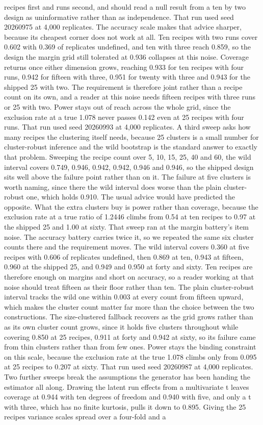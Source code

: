 recipes first and runs second, and should read a null result from a ten by two design as uninformative rather than as independence. That run used seed 20260975 at 4,000 replicates. The accuracy scale makes that advice sharper, because its cheapest corner does not work at all. Ten recipes with two runs cover 0.602 with 0.369 of replicates undefined, and ten with three reach 0.859, so the design the margin grid still tolerated at 0.936 collapses at this noise. Coverage returns once either dimension grows, reaching 0.933 for ten recipes with four runs, 0.942 for fifteen with three, 0.951 for twenty with three and 0.943 for the shipped 25 with two. The requirement is therefore joint rather than a recipe count on its own, and a reader at this noise needs fifteen recipes with three runs or 25 with two. Power stays out of reach across the whole grid, since the exclusion rate at a true 1.078 never passes 0.142 even at 25 recipes with four runs. That run used seed 20260993 at 4,000 replicates. A third sweep asks how many recipes the clustering itself needs, because 25 clusters is a small number for cluster-robust inference and the wild bootstrap is the standard answer to exactly that problem. Sweeping the recipe count over 5, 10, 15, 25, 40 and 60, the wild interval covers 0.749, 0.946, 0.942, 0.942, 0.946 and 0.946, so the shipped design sits well above the failure point rather than on it. The failure at five clusters is worth naming, since there the wild interval does worse than the plain cluster-robust one, which holds 0.910. The usual advice would have predicted the opposite. What the extra clusters buy is power rather than coverage, because the exclusion rate at a true ratio of 1.2446 climbs from 0.54 at ten recipes to 0.97 at the shipped 25 and 1.00 at sixty. That sweep ran at the margin battery's item noise. The accuracy battery carries twice it, so we repeated the same six cluster counts there and the requirement moves. The wild interval covers 0.360 at five recipes with 0.606 of replicates undefined, then 0.869 at ten, 0.943 at fifteen, 0.960 at the shipped 25, and 0.949 and 0.950 at forty and sixty. Ten recipes are therefore enough on margins and short on accuracy, so a reader working at that noise should treat fifteen as their floor rather than ten. The plain cluster-robust interval tracks the wild one within 0.003 at every count from fifteen upward, which makes the cluster count matter far more than the choice between the two constructions. The size-clustered fallback recovers as the grid grows rather than as its own cluster count grows, since it holds five clusters throughout while covering 0.850 at 25 recipes, 0.911 at forty and 0.942 at sixty, so its failure came from thin clusters rather than from few ones. Power stays the binding constraint on this scale, because the exclusion rate at the true 1.078 climbs only from 0.095 at 25 recipes to 0.207 at sixty. That run used seed 20260987 at 4,000 replicates. Two further sweeps break the assumptions the generator has been handing the estimator all along. Drawing the latent run effects from a multivariate t leaves coverage at 0.944 with ten degrees of freedom and 0.940 with five, and only a t with three, which has no finite kurtosis, pulls it down to 0.895. Giving the 25 recipes variance scales spread over a four-fold and a 